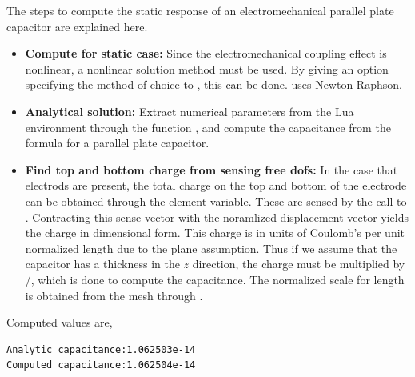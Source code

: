 \clearpage
The steps to compute the static response of an electromechanical
parallel plate capacitor are 
explained here. 

\begin{itemize}

  \item{\textbf{Compute for static case:}}
  Since the electromechanical coupling effect is nonlinear,
  a nonlinear solution method must be used. By giving an 
  option  specifying the method of choice to
  , this can be done.  uses
  Newton-Raphson.

  \item{\textbf{Analytical solution:}}
  Extract numerical parameters from the Lua environment through the 
  function , and compute the capacitance
  from the formula for a parallel plate capacitor.
  
  \item{\textbf{Find top and bottom charge from sensing free dofs:}}
  In the case that electrods are present, the total charge on the
  top and bottom of the electrode can be obtained through the 
  element variable. These are sensed by the call to 
  . Contracting this sense vector
  with the noramlized displacement vector yields the charge in 
  dimensional form. This charge is in
  units of Coulomb's per unit normalized length due to the plane
  assumption. Thus if we assume that the capacitor has a 
  thickness in the $z$ direction, the charge must be multiplied
  by /, which is done to compute the capacitance.
  The normalized scale for length is obtained from the mesh through
  .

\end{itemize}

Computed values are,
\begin{verbatim}
Analytic capacitance:1.062503e-14
Computed capacitance:1.062504e-14
\end{verbatim}


